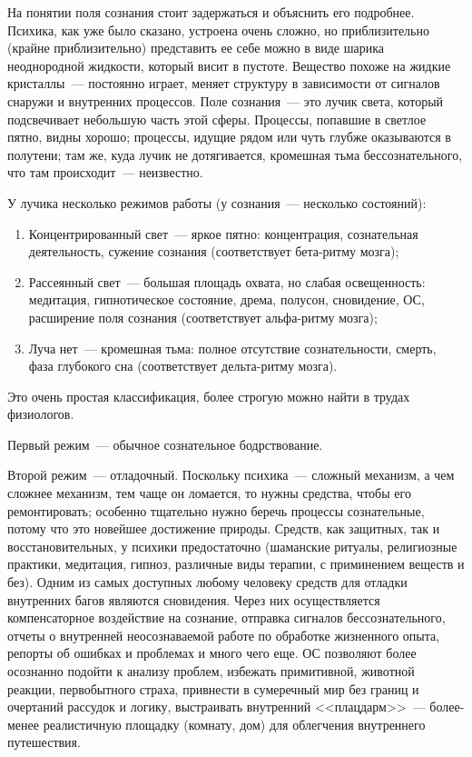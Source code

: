 \documentclass[a5paper,12pt,twoside]{memoir}
\begin{document}
На понятии поля сознания стоит задержаться и объяснить его подробнее. Психика, как уже было сказано, устроена очень сложно, но приблизительно (крайне приблизительно) представить ее себе можно в виде шарика неоднородной жидкости, который висит в пустоте. Вещество похоже на жидкие кристаллы~--- постоянно играет, меняет структуру в зависимости от сигналов снаружи и внутренних процессов. Поле сознания~--- это лучик света, который подсвечивает небольшую часть этой сферы. Процессы, попавшие в светлое пятно, видны хорошо; процессы, идущие рядом или чуть глубже оказываются в полутени; там же, куда лучик не дотягивается, кромешная тьма бессознательного, что там происходит~--- неизвестно.

У лучика несколько режимов работы (у сознания~--- несколько состояний):

\begin{enumerate}
\item Концентрированный свет~--- яркое пятно: концентрация, сознательная деятельность, сужение сознания (соответствует бета-ритму мозга);
\item Рассеянный свет~--- большая площадь охвата, но слабая освещенность: медитация, гипнотическое состояние, дрема, полусон, сновидение, ОС, расширение поля сознания (соответствует альфа-ритму мозга);
\item Луча нет~--- кромешная тьма: полное отсутствие сознательности, смерть, фаза глубокого сна (соответствует дельта-ритму мозга).
\end{enumerate}

Это очень простая классификация, более строгую можно найти в трудах физиологов.

Первый режим~--- обычное сознательное бодрствование.

Второй режим~--- отладочный. Поскольку психика~--- сложный механизм, а чем сложнее механизм, тем чаще он ломается, то нужны средства, чтобы его ремонтировать; особенно тщательно нужно беречь процессы сознательные, потому что это новейшее достижение природы. Средств, как защитных, так и восстановительных, у психики предостаточно (шаманские ритуалы, религиозные практики, медитация, гипноз, различные виды терапии, с приминением веществ и без). Одним из самых доступных любому человеку средств для отладки внутренних багов являются сновидения. Через них осуществляется компенсаторное воздействие на сознание, отправка сигналов бессознательного, отчеты о внутренней неосознаваемой работе по обработке жизненного опыта, репорты об ошибках и проблемах и много чего еще. ОС позволяют более осознанно подойти к анализу проблем, избежать примитивной, животной реакции, первобытного страха, привнести в сумеречный мир без границ и очертаний рассудок и логику, выстраивать внутренний <<плацдарм>>~--- более-менее реалистичную площадку (комнату, дом) для облегчения внутреннего путешествия.
\end{document}
